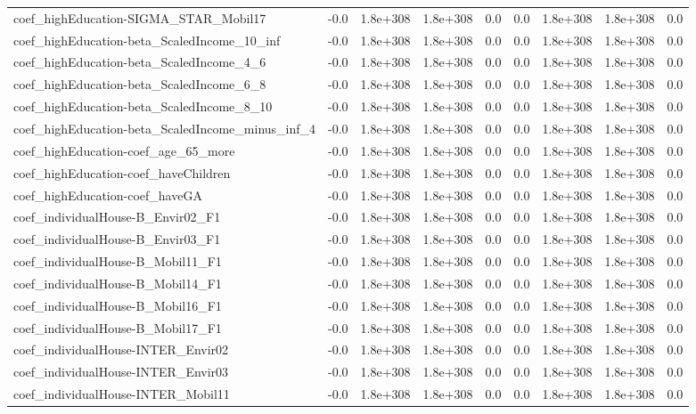 \begin{tabular}{lrrrrrrrr}
coef_highEducation-SIGMA_STAR_Mobil17 & -0.0 & 1.8e+308 & 1.8e+308 & 0.0 & 0.0 & 1.8e+308 & 1.8e+308 & 0.0 \\
coef_highEducation-beta_ScaledIncome_10_inf & -0.0 & 1.8e+308 & 1.8e+308 & 0.0 & 0.0 & 1.8e+308 & 1.8e+308 & 0.0 \\
coef_highEducation-beta_ScaledIncome_4_6 & -0.0 & 1.8e+308 & 1.8e+308 & 0.0 & 0.0 & 1.8e+308 & 1.8e+308 & 0.0 \\
coef_highEducation-beta_ScaledIncome_6_8 & -0.0 & 1.8e+308 & 1.8e+308 & 0.0 & 0.0 & 1.8e+308 & 1.8e+308 & 0.0 \\
coef_highEducation-beta_ScaledIncome_8_10 & -0.0 & 1.8e+308 & 1.8e+308 & 0.0 & 0.0 & 1.8e+308 & 1.8e+308 & 0.0 \\
coef_highEducation-beta_ScaledIncome_minus_inf_4 & -0.0 & 1.8e+308 & 1.8e+308 & 0.0 & 0.0 & 1.8e+308 & 1.8e+308 & 0.0 \\
coef_highEducation-coef_age_65_more & -0.0 & 1.8e+308 & 1.8e+308 & 0.0 & 0.0 & 1.8e+308 & 1.8e+308 & 0.0 \\
coef_highEducation-coef_haveChildren & -0.0 & 1.8e+308 & 1.8e+308 & 0.0 & 0.0 & 1.8e+308 & 1.8e+308 & 0.0 \\
coef_highEducation-coef_haveGA & -0.0 & 1.8e+308 & 1.8e+308 & 0.0 & 0.0 & 1.8e+308 & 1.8e+308 & 0.0 \\
coef_individualHouse-B_Envir02_F1 & -0.0 & 1.8e+308 & 1.8e+308 & 0.0 & 0.0 & 1.8e+308 & 1.8e+308 & 0.0 \\
coef_individualHouse-B_Envir03_F1 & -0.0 & 1.8e+308 & 1.8e+308 & 0.0 & 0.0 & 1.8e+308 & 1.8e+308 & 0.0 \\
coef_individualHouse-B_Mobil11_F1 & -0.0 & 1.8e+308 & 1.8e+308 & 0.0 & 0.0 & 1.8e+308 & 1.8e+308 & 0.0 \\
coef_individualHouse-B_Mobil14_F1 & -0.0 & 1.8e+308 & 1.8e+308 & 0.0 & 0.0 & 1.8e+308 & 1.8e+308 & 0.0 \\
coef_individualHouse-B_Mobil16_F1 & -0.0 & 1.8e+308 & 1.8e+308 & 0.0 & 0.0 & 1.8e+308 & 1.8e+308 & 0.0 \\
coef_individualHouse-B_Mobil17_F1 & -0.0 & 1.8e+308 & 1.8e+308 & 0.0 & 0.0 & 1.8e+308 & 1.8e+308 & 0.0 \\
coef_individualHouse-INTER_Envir02 & -0.0 & 1.8e+308 & 1.8e+308 & 0.0 & 0.0 & 1.8e+308 & 1.8e+308 & 0.0 \\
coef_individualHouse-INTER_Envir03 & -0.0 & 1.8e+308 & 1.8e+308 & 0.0 & 0.0 & 1.8e+308 & 1.8e+308 & 0.0 \\
coef_individualHouse-INTER_Mobil11 & -0.0 & 1.8e+308 & 1.8e+308 & 0.0 & 0.0 & 1.8e+308 & 1.8e+308 & 0.0 \\

\end{tabular}
